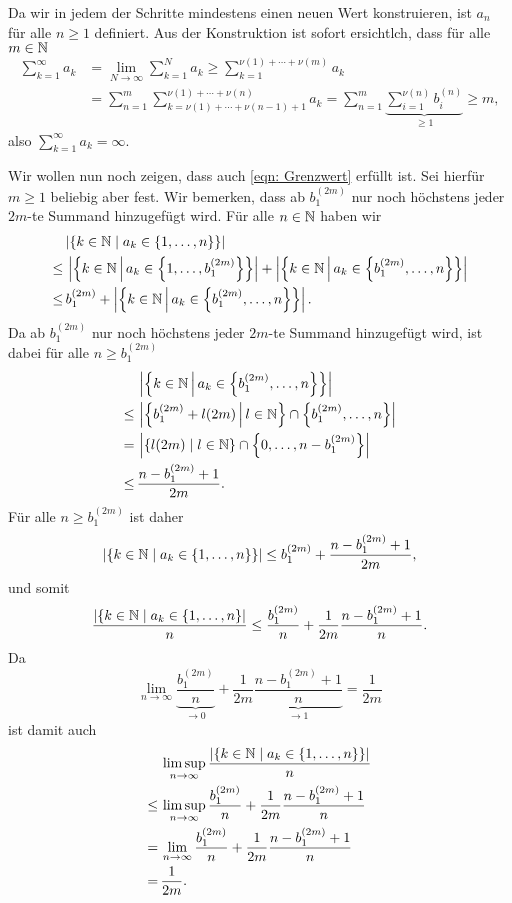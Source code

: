\documentclass[a4paper,10pt]{article}
\begin{document}
Da wir in jedem der Schritte mindestens einen neuen Wert konstruieren, ist $a_n$ für alle $n \geq 1$ definiert. Aus der Konstruktion ist sofort ersichtlch, dass für alle $m \in \mathbb{N}$
\begin{align*}
 \sum_{k=1}^\infty a_k
 &= \lim_{N \to \infty} \sum_{k=1}^N a_k
 \geq \sum_{k=1}^{\nu(1)+\dotsb+\nu(m)} a_k \\
 &= \sum_{n=1}^m \sum_{k=\nu(1)+\dotsb+\nu(n-1)+1}^{\nu(1)+\dotsb+\nu(n)} a_k
 = \sum_{n=1}^m \underbrace{\sum_{i=1}^{\nu(n)} b^{(n)}_i}_{\geq 1}
 \geq m,
\end{align*}
also $\sum_{k=1}^\infty a_k = \infty$.

Wir wollen nun noch zeigen, dass auch \eqref{eqn: Grenzwert} erfüllt ist. Sei hierfür $m \geq 1$ beliebig aber fest. Wir bemerken, dass ab $b^{(2m)}_1$ nur noch höchstens jeder $2m$-te Summand hinzugefügt wird. Für alle $n \in \mathbb{N}$ haben wir
\begin{align*}
     &\, |\{k \in \mathbb{N} \mid a_k \in \{1, \dotsc, n\}\}| \\
 \leq&\, \left|\left\{k \in \mathbb{N} \,\middle|\, a_k \in \left\{1, \dotsc, b^{(2m)}_1\right\}\right\}\right|
         + \left|\left\{k \in \mathbb{N} \,\middle|\, a_k \in \left\{b^{(2m)}_1, \dotsc, n\right\}\right\}\right| \\
  \leq&\, b^{(2m)}_1 + \left|\left\{k \in \mathbb{N} \,\middle|\, a_k \in \left\{b^{(2m)}_1, \dotsc, n\right\}\right\}\right|.
\end{align*}
Da ab $b^{(2m)}_1$ nur noch höchstens jeder $2m$-te Summand hinzugefügt wird, ist dabei für alle $n \geq b^{(2m)}_1$
\begin{align*}
     &\, \left|\left\{k \in \mathbb{N} \,\middle|\, a_k \in \left\{b^{(2m)}_1, \dotsc, n\right\}\right\}\right| \\
 \leq&\, \left|\left\{b^{(2m)}_1 + l(2m) \,\middle|\, l \in \mathbb{N}\right\} \cap \left\{b^{(2m)}_1, \dotsc, n\right\}\right| \\
    =&\, \left|\{l(2m) \mid l \in \mathbb{N}\} \cap \left\{0, \dotsc, n-b^{(2m)}_1\right\}\right| \\
 \leq&\, \frac{n-b^{(2m)}_1+1}{2m}.
\end{align*}
Für alle $n \geq b^{(2m)}_1$ ist daher
\[
 |\{k \in \mathbb{N} \mid a_k \in \{1, \dotsc, n\}\}|
 \leq b^{(2m)}_1 + \frac{n-b^{(2m)}_1 + 1}{2m},
\]
und somit
\[
 \frac{|\{k \in \mathbb{N} \mid a_k \in \{1, \dotsc, n\}|}{n}
 \leq \frac{b^{(2m)}_1}{n} + \frac{1}{2m} \frac{n-b^{(2m)}_1 + 1}{n}.
\]
Da
\[
 \lim_{n \to \infty} \underbrace{\frac{b^{(2m)}_1}{n}}_{\to 0} + \frac{1}{2m} \underbrace{\frac{n-b^{(2m)}_1 + 1}{n}}_{\to 1}
 = \frac{1}{2m}
\]
ist damit auch
\begin{align*}
     &\, \limsup_{n \to \infty} \frac{|\{k \in \mathbb{N} \mid a_k \in \{1, \dotsc, n\}\}|}{n} \\
 \leq&\, \limsup_{n \to \infty} \frac{b^{(2m)}_1}{n} + \frac{1}{2m} \frac{n-b^{(2m)}_1 + 1}{n} \\
    =&\, \lim_{n \to \infty} \frac{b^{(2m)}_1}{n} + \frac{1}{2m} \frac{n-b^{(2m)}_1 + 1}{n} \\
    =&\, \frac{1}{2m}.
\end{align*}
\end{document}
